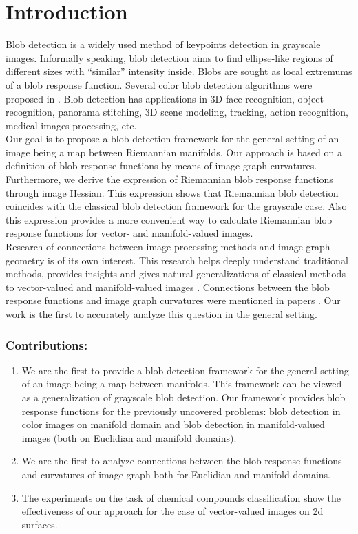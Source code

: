 \documentclass{llncs}
\begin{document}
\section{Introduction}
%
Blob detection \cite{blob} is a widely used method of keypoints detection in grayscale images. Informally speaking, blob detection aims to find ellipse-like regions of different sizes with “similar” intensity inside. Blobs are sought as local extremums of a blob response function. Several color blob detection algorithms were proposed in \cite{ColorBlob,GROM}. Blob detection has applications in 3D face recognition, object recognition, panorama stitching, 3D scene modeling, tracking, action recognition, medical images processing, etc.
\\
Our goal is to propose a blob detection framework for the general setting of an image being a map between Riemannian manifolds. Our approach is based on a definition of blob response functions by means of image graph curvatures. Furthermore, we derive the expression of Riemannian blob response functions through image Hessian. This expression shows that Riemannian blob detection coincides with the classical blob detection framework for the grayscale case. Also this expression provides a more convenient way to calculate Riemannian blob response functions for vector- and manifold-valued images.
\\
Research of connections between image processing methods and image graph geometry is of its own interest. This research helps deeply understand traditional methods, provides insights and gives natural generalizations of classical methods to vector-valued and manifold-valued images \cite{Saucan,Kimmel,Batard}. Connections between the blob response functions and image graph curvatures were mentioned in papers \cite{BlobCurv1,BlobCurv2}. Our work is the first to accurately analyze this question in the general setting.

\subsubsection{Contributions:}
\begin{enumerate}
\item We are the first to provide a blob detection framework for the general setting of an image being a map between manifolds. This framework can be viewed as a generalization of grayscale blob detection. Our framework provides blob response functions for the previously uncovered problems: blob detection in color images on manifold domain and blob detection in manifold-valued images (both on Euclidian and manifold domains). 
\item We are the first to analyze connections between the blob response functions and curvatures of image graph both for Euclidian and manifold domains.
\item The experiments on the task of chemical compounds classification show the effectiveness of our approach for the case of vector-valued images on 2d surfaces.  
\end{enumerate}
\end{document}
